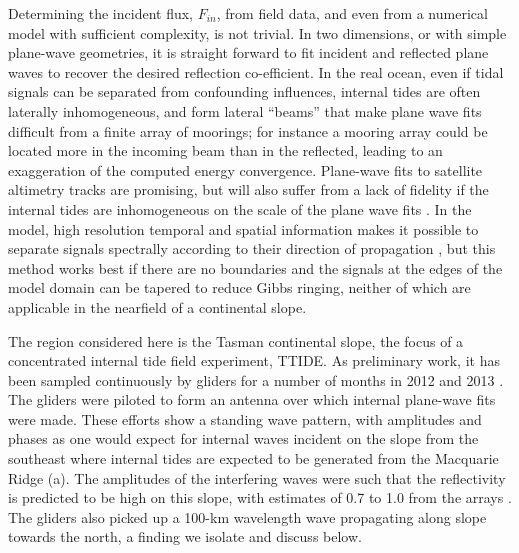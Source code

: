 \documentclass[12pt]{article}
\newcommand{\tempS}[1]{}
\begin{document}
Determining the incident flux, $F_{in}$, from field data, and even from a numerical model with sufficient complexity, is not trivial.  In two dimensions, or with simple plane-wave geometries, it is straight forward to fit incident and reflected plane waves to recover the desired reflection co-efficient.  In the real ocean, even if  tidal signals can be  separated from confounding influences, internal tides are often laterally inhomogeneous, and form  lateral ``beams'' \citep[in x-y;][]{rainvilleetal10} that make plane wave fits difficult from a finite array of moorings; for instance a mooring array could be located more in the incoming beam than in the reflected, leading to an exaggeration of the computed energy convergence.    Plane-wave fits to satellite altimetry tracks are promising, but will also suffer from a lack of fidelity if the internal tides are inhomogeneous on the scale of the plane wave fits \citep{zhaoalford09}.  In the model, high resolution temporal and spatial information makes it possible to separate signals spectrally according to their direction of propagation \citep[i.e. using a Hilbert transform,][]{mercieretal08}, but this method works best if there are no boundaries and the signals at the edges of the model domain can be tapered to reduce Gibbs ringing, neither of which are applicable in the nearfield of a continental slope.  

The region considered here is the Tasman continental slope, the focus of a concentrated internal tide field experiment, TTIDE.   As preliminary work, it has been sampled continuously by gliders for a number of months in 2012 and 2013 \citep{johnstonetal15}.  The gliders were piloted to form an antenna over which internal  plane-wave fits were made.  These efforts show a  standing wave pattern, with amplitudes and phases as one would expect for internal waves incident on the slope from the southeast where internal tides are expected to be generated from the Macquarie Ridge (a).  The amplitudes of the interfering waves were such that the reflectivity is predicted to be high on this slope, with estimates of 0.7 to 1.0 from the arrays \citep{johnstonetal15}.  The gliders also picked up a 100-km wavelength wave propagating along slope towards the north, a finding we isolate and discuss below.    

\end{document}

